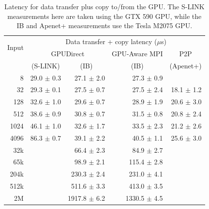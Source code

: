 \documentclass[journal]{IEEEtran}
\begin{document}
\begin{table}[!t]
  \centering
  \begin{tabular}{|r||r|r|r|r|}
    \hline
    \multicolumn{1}{|c||}{\multirow{2}{*}{Input}} & \multicolumn{4}{|c|}{Data transfer + copy latency  ($\mu$s)}  \\\cline{2-5}
    \multirow{2}{*}{(Bytes)}
& \multicolumn{2}{|c|}{GPUDirect}
& \multicolumn{1}{|c|}{GPU-Aware MPI}
& \multicolumn{1}{|c|}{P2P} \\
& \multicolumn{1}{|c|}{(S-LINK)}
& \multicolumn{1}{|c|}{(IB)}
& \multicolumn{1}{|c|}{(IB)}
& \multicolumn{1}{|c|}{(Apenet+)} \\

    \hline
    \hline
     8    & 29.0 $\pm$ 0.3 & 27.1 $\pm$ 2.0   & 27.3 $\pm$ 0.9 &  \\
     32   & 29.3 $\pm$ 0.1 & 27.5 $\pm$ 0.7   & 27.5 $\pm$ 2.4 &  18.1 $\pm$ 1.2 \\
     128  & 32.6 $\pm$ 1.0 & 29.6 $\pm$ 0.7   & 28.9 $\pm$ 1.9 &  20.6 $\pm$ 3.0\\
     512  & 38.6 $\pm$ 0.9 & 30.8 $\pm$ 0.7   & 31.5 $\pm$ 0.8 &  20.8 $\pm$ 2.4\\
     1024 & 46.1 $\pm$ 1.0 & 32.6 $\pm$ 1.7   & 33.5 $\pm$ 2.3 &  21.2 $\pm$ 2.6\\
     4096 & 86.3 $\pm$ 0.7 & 39.1 $\pm$ 2.2   & 40.5 $\pm$ 1.1  &  25.6 $\pm$ 3.0\\
     32k  &                & 66.4 $\pm$ 2.3   & 84.9 $\pm$ 2.7 &\\
     65k  &                & 98.9 $\pm$ 2.1   &  115.4 $\pm$ 2.8 &\\
     204k &                & 230.3 $\pm$ 2.4  &  231.0 $\pm$ 4.1 &\\
     512k &                & 511.6 $\pm$ 3.3  &  413.0 $\pm$ 3.5 &\\
     2M   &                & 1917.8 $\pm$ 6.2 &  1330.5 $\pm$ 4.5 &\\
     
    \hline
  \end{tabular}
\caption{Latency for data transfer plus copy to/from the GPU. The S-LINK measurements here are taken using the GTX 590 GPU, while the IB and Apenet+ measurements use the Tesla M2075 GPU.}
\label{tab_MC}
\end{table}
\end{document}
